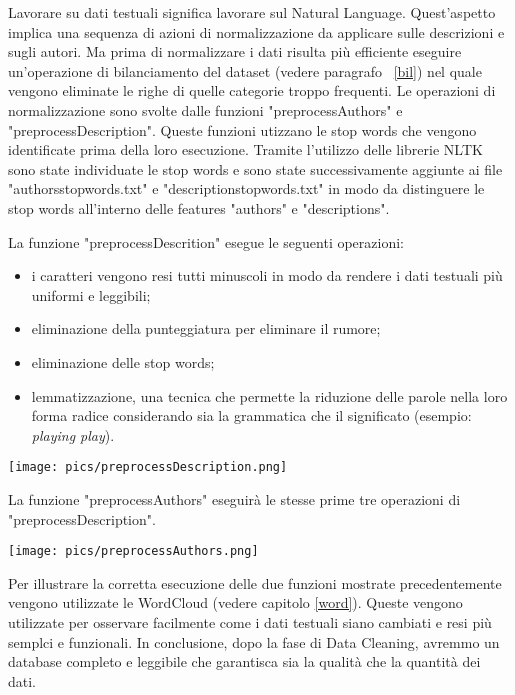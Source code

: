 \documentclass[12pt,oneside]{article}
\begin{document}
\begin{enumerate}
    \begin{justify}
    Lavorare su dati testuali significa lavorare sul Natural Language. Quest'aspetto implica una sequenza di azioni di normalizzazione da applicare sulle descrizioni e sugli autori. Ma prima di normalizzare i dati risulta più efficiente eseguire un'operazione di bilanciamento del dataset (vedere paragrafo ~\ref{bil}) nel quale vengono eliminate le righe di quelle categorie troppo frequenti.
    Le operazioni di normalizzazione sono svolte dalle funzioni "preprocessAuthors" e "preprocessDescription". Queste funzioni utizzano le stop words che vengono identificate prima della loro esecuzione. Tramite l'utilizzo delle librerie NLTK sono state individuate le stop words e sono state successivamente aggiunte ai file "authors\textunderscore{}stopwords.txt" e "description\textunderscore{}stopwords.txt" in modo da distinguere le stop words all'interno delle features "authors" e "descriptions". 
    \end{justify}
    \newpage
    \begin{justify}
    \hypertarget{preD}{
    La funzione "preprocessDescrition" esegue le seguenti operazioni:
    \begin{itemize}
        \item i caratteri vengono resi tutti minuscoli in modo da rendere i dati testuali più uniformi e leggibili;
        \item eliminazione della punteggiatura per eliminare il rumore;
        \item eliminazione delle stop words;
        \item lemmatizzazione, una tecnica che permette la riduzione delle parole nella loro forma radice considerando sia la grammatica che il significato (esempio: \textit{playing play}).
    \end{itemize}
    }
    \end{justify}
    \texttt{[image: pics/preprocessDescription.png]}
    \newpage
    \begin{justify}
    \hypertarget{preA}{
    La funzione "preprocessAuthors" eseguirà le stesse prime tre operazioni di "preprocessDescription".
    }
    \end{justify}
    
    \texttt{[image: pics/preprocessAuthors.png]}
    \begin{justify}
    Per illustrare la corretta esecuzione delle due funzioni mostrate precedentemente vengono utilizzate le WordCloud (vedere capitolo \ref{word}). Queste vengono utilizzate per osservare facilmente come i dati testuali siano cambiati e resi più semplci e funzionali.
    In conclusione, dopo la fase di Data Cleaning, avremmo un database completo e leggibile che garantisca sia la qualità che la quantità dei dati. 
    \end{justify}
    \end{enumerate}
    
\end{document}
